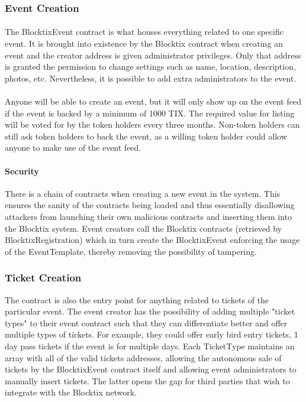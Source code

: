 \documentclass[a4paper]{article}
\begin{document}
\subsubsection{Event Creation}
\paragraph{}
The BlocktixEvent contract is what houses everything related to one specific event. It is brought into existence by the Blocktix contract when creating an event and the creator address is given administrator privileges. Only that address is granted the permission to change settings such as name, location, description, photos, etc. Nevertheless, it is possible to add extra administrators to the event.

\paragraph{}
Anyone will be able to create an event, but it will only show up on the event feed if the event is backed by a minimum of 1000 TIX. The required value for listing will be voted for by the token holders every three months. Non-token holders can still ask token holders to back the event, as a willing token holder could allow anyone to make use of the event feed.

\paragraph{Security} There is a chain of contracts when creating a new event in the system. This ensures the sanity of the contracts being loaded and thus essentially disallowing attackers from launching their own malicious contracts and inserting them into the Blocktix system. Event creators call the Blocktix contracts (retrieved by BlocktixRegistration) which in turn create the BlocktixEvent enforcing the usage of the EventTemplate, thereby removing the possibility of tampering.

\subsubsection{Ticket Creation}
The contract is also the entry point for anything related to tickets of the particular event. The event creator has the possibility of adding multiple "ticket types" to their event contract such that they can differentiate better and offer multiple types of tickets. For example, they could offer early bird entry tickets, 1 day pass tickets if the event is for multiple days. Each TicketType maintains an array with all of the valid tickets addresses, allowing the autonomous sale of tickets by the BlocktixEvent contract itself and allowing event administrators to manually insert tickets. The latter opens the gap for third parties that wish to integrate with the Blocktix network. 
\end{document}
